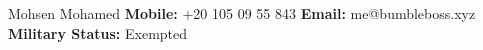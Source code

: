 {
    \noindent
    \fontsize{27pt}{27pt}\blackColor\optifont
    Mohsen Mohamed
}
\newline
{
    \fontsize{10pt}{10pt}
    \textbf{Mobile:} +20 105 09 55 843
    \quad\quad
    \textbf{Email:} me@bumbleboss.xyz
    \quad\quad
    \textbf{Military Status:} Exempted
}